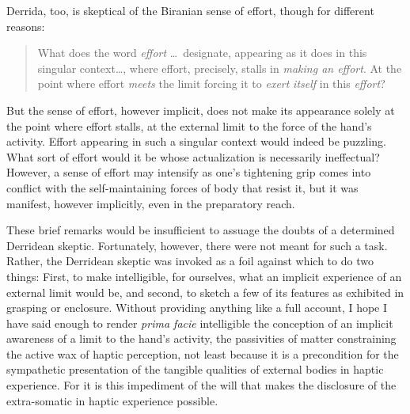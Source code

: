 Derrida, too, is skeptical of the Biranian sense of effort, though for different reasons:
\begin{quote}
	What does the word \emph{effort} \ldots\ designate, appearing as it does in this singular context\ldots, where effort, precisely, stalls in \emph{making an effort}. At the point where effort \emph{meets} the limit forcing it to \emph{exert} \emph{itself} in this \emph{effort}? \citealt[110]{Derrida:2005aa}
\end{quote}
But the sense of effort, however implicit, does not make its appearance solely at the point where effort stalls, at the external limit to the force of the hand's activity. Effort appearing in such a singular context would indeed be puzzling. What sort of effort would it be whose actualization is necessarily ineffectual? However, a sense of effort may intensify as one's tightening grip comes into conflict with the self-maintaining forces of body that resist it, but it was manifest, however implicitly, even in the preparatory reach.

These brief remarks would be insufficient to assuage the doubts of a determined Derridean skeptic. Fortunately, however, there were not meant for such a task. Rather, the Derridean skeptic was invoked as a foil against which to do two things: First, to make intelligible, for ourselves, what an implicit experience of an external limit would be, and second, to sketch a few of its features as exhibited in grasping or enclosure. Without providing anything like a full account, I hope I have said enough to render \emph{prima facie} intelligible the conception of an implicit awareness of a limit to the hand's activity, the passivities of matter constraining the active wax of haptic perception, not least because it is a precondition for the sympathetic presentation of the tangible qualities of external bodies in haptic experience. For it is this impediment of the will that makes the disclosure of the extra-somatic in haptic experience possible.

